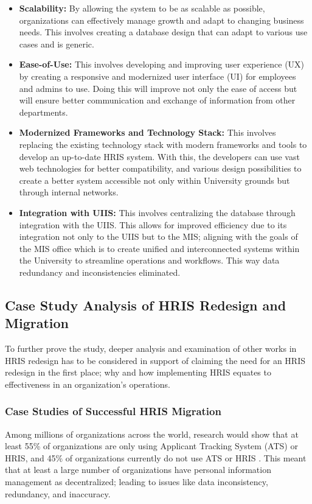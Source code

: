         \begin{itemize}
            \item[] \textbf{Scalability:} By allowing the system to be as scalable as possible, organizations can effectively manage growth and adapt to changing business needs. This involves creating a database design that can adapt to various use cases and is generic. 
            \item[] \textbf{Ease-of-Use:} This involves developing and improving user experience (UX) by creating a responsive and modernized user interface (UI) for employees and admins to use. Doing this will improve not only the ease of access but will ensure better communication and exchange of information from other departments.
            \item[] \textbf{Modernized Frameworks and Technology Stack:} This involves replacing the existing technology stack with modern frameworks and tools to develop an up-to-date HRIS system. With this, the developers can use vast web technologies for better compatibility, and various design possibilities to create a better system accessible not only within University grounds but through internal networks.
            \item[] \textbf{Integration with UIIS:} This involves centralizing the database through integration with the UIIS. This allows for improved efficiency due to its integration not only to the UIIS but to the MIS; aligning with the goals of the MIS office which is to create unified and interconnected systems within the University to streamline operations and workflows. This way data redundancy and inconsistencies eliminated.
        \end{itemize}
    
    \subsection{Case Study Analysis of HRIS Redesign and Migration}
    To further prove the study, deeper analysis and examination of other works in HRIS redesign has to be considered in support of claiming the need for an HRIS redesign in the first place; why and how implementing HRIS equates to effectiveness in an organization's operations.
    
        \subsubsection{Case Studies of Successful HRIS Migration}
        Among millions of organizations across the world, research would show that at least 55\% of organizations are only using Applicant Tracking System (ATS) or HRIS, and 45\% of organizations currently do not use ATS or HRIS \cite{ms12019}. This meant that at least a large number of organizations have personal information management as decentralized; leading to issues like data inconsistency, redundancy, and inaccuracy.


